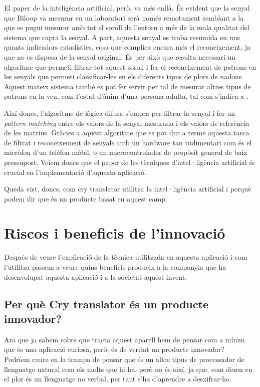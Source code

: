\documentclass[11pt,a4paper]{article}
\begin{document}
El paper de la inteligència artificial, però, va més enllà. És evident que la senyal que Biloop va mesurar en un laboratori serà només remotament semblant a la que es pugui mesurar amb tot el soroll de l'entorn a més de la mala qualitat del sistema que capta la senyal. A part, aquesta senyal es troba resumida en uns quants indicadors estadístics, cosa que complica encara més el reconeixement, ja que no es disposa de la senyal original. És per això que resulta necessari un algoritme que permeti filtrar tot aquest soroll i fer el reconeixement de patrons en les senyals que permeti classificar-les en els diferents tipus de plors de nadons. Aquest mateix sistema també es pot fer servir per tal de mesurar altres tipus de patrons en la veu, com l'estat d'ànim d'una persona adulta, tal com s'indica a \cite{patent}.

Així doncs, l'algoritme de lògica difusa s'empra per filtrar la senyal i fer un \emph{pattern matching} entre els valors de la senyal mesurada i els valors de referència de les matrius. Gràcies a aquest algoritme que es pot dur a terme aquesta tasca de filtrat i reconeixement de senyals amb un hardware tan rudimentari com és el micròfon d'un telèfon mòbil, o un microcontrolador de propòsit general de baix pressupost. Veiem doncs que el paper de les tècniques d'intel·ligència artificial és crucial en l'implementació d'aquesta aplicació.

Queda vist, doncs, com cry translator utilitza la intel·ligència artificial i perquè podem dir que és un producte basat en aquest camp.

\section{\textsf{Riscos i beneficis de l'innovació}}
\label{riscos-beneficis}
Després de veure l'explicació de la tècnica utilitzada en aquesta aplicació i com l'utilitza passem a veure quins beneficis produeix a la companyia que ha desenvolupat aquesta aplicació i a la societat aquest invent.

\subsection{\textsf{Per què Cry translator és un producte innovador?}}
\label{justificacio}
Ara que ja sabem sobre que tracta aquest aparell hem de pensar com a mínim que és una aplicació curiosa, però, és de veritat un producte innovador?\\
Podríem caure en la trampa de pensar que és un altre tipus de processador de llenguatge natural com els molts que hi ha, però no és així, ja que, com diuen en \cite{elmundo} el plor és un llenguatge no verbal, per tant s'ha d'aprendre a desxifrar-ho.
\end{document}
